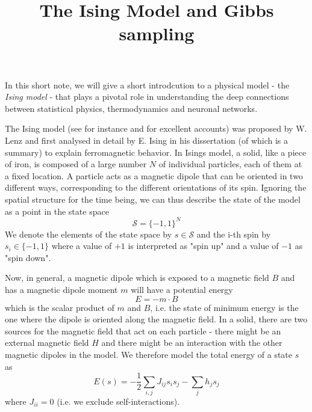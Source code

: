 \documentclass[a4paper, draft]{article}
\title{The Ising Model and Gibbs sampling}
\theoremstyle{own}
\theoremstyle{remark}
\begin{document}
\maketitle







In this short note, we will give a short introdcution to a physical model - the {\em Ising model} - that plays a pivotal role in understanding the deep connections between statistical physics, thermodynamics and neuronal networks.

The Ising model (see for instance \cite{Schroeder} and \cite{MacKay} for excellent accounts) was proposed by W. Lenz and first analysed in detail by E. Ising in his dissertation (of which \cite{Ising1924} is a summary) to explain ferromagnetic behavior. In Isings model, a solid, like a piece of iron, is composed of a large number $N$ of individual particles, each of them at a fixed location. A particle acts as a magnetic dipole that can be oriented in two different ways, corresponding to the different orientations of its spin. Ignoring the spatial structure for the time being, we can thus describe the state of the model as a point in the state space
$$
{\mathcal S} = \{ -1, 1\}^N
$$
We denote the elements of the state space by $s \in {\mathcal S}$ and the i-th spin by $s_i \in \{-1,1\}$ where a value of $+1$ is interpreted as "spin up" and a value of $-1$ as "spin down". 

Now, in general, a magnetic dipole which is exposed to a magnetic field $B$ and has a magnetic dipole moment $m$ will have a potential energy
$$
E = - m \cdot B
$$
which is the scalar product of $m$ and $B$, i.e. the state of minimum energy is the one where the dipole is oriented along the magnetic field. In a solid, there are two sources for the magnetic field that act on each particle - there might be an external magnetic field $H$ and there might be an interaction with the other magnetic dipoles in the model. We therefore model the total energy of a state $s$ as
$$
E(s) = - \frac{1}{2} \sum_{i,j} J_{ij} s_i s_j - \sum_j h_j s_j
$$
where $J_{ii} = 0$ (i.e. we exclude self-interactions).
\end{document}
